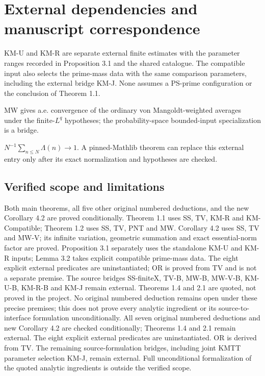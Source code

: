 \section*{External dependencies and manuscript correspondence}
\begin{inputthm}\label{input:KM}
KM-U and KM-R are separate external finite estimates with the parameter ranges recorded in Proposition 3.1 and the shared catalogue. The compatible input also selects the prime-mass data with the same comparison parameters, including the external bridge KM-J. None assumes a PS-prime configuration or the conclusion of Theorem 1.1.
\end{inputthm}
\begin{inputthm}\label{input:MW}
MW gives a.e. convergence of the ordinary von Mangoldt-weighted averages under the finite-$L^q$ hypotheses; the probability-space bounded-input specialization is a bridge.
\end{inputthm}
\begin{inputthm}\label{input:PNT}
$N^{-1}\sum_{n\leq N}\Lambda(n)\to1$. A pinned-Mathlib theorem can replace this external entry only after its exact normalization and hypotheses are checked.
\end{inputthm}

\ifDetailed\else\small\fi


\normalsize

\subsection*{Verified scope and limitations}
\ifDetailed
Both main theorems, all five other original numbered deductions, and the new Corollary 4.2 are proved conditionally. Theorem 1.1 uses SS, TV, KM-R and KM-Compatible; Theorem 1.2 uses SS, TV, PNT and MW. Corollary 4.2 uses SS, TV and MW-V; its infinite variation, geometric summation and exact essential-norm factor are proved. Proposition 3.1 separately uses the standalone KM-U and KM-R inputs; Lemma 3.2 takes explicit compatible prime-mass data. The eight explicit external predicates are uninstantiated; OR is proved from TV and is not a separate premise. The source bridges SS-finiteX, TV-B, MW-B, MW-V-B, KM-U-B, KM-R-B and KM-J remain external. Theorems 1.4 and 2.1 are quoted, not proved in the project. No original numbered deduction remains open under these precise premises; this does not prove every analytic ingredient or its source-to-interface formulation unconditionally.
\else
All seven original numbered deductions and new Corollary 4.2 are checked conditionally; Theorems 1.4 and 2.1 remain external. The eight explicit external predicates are uninstantiated. OR is derived from TV. The remaining source-formulation bridges, including joint KMTT parameter selection KM-J, remain external. Full unconditional formalization of the quoted analytic ingredients is outside the verified scope.
\fi

